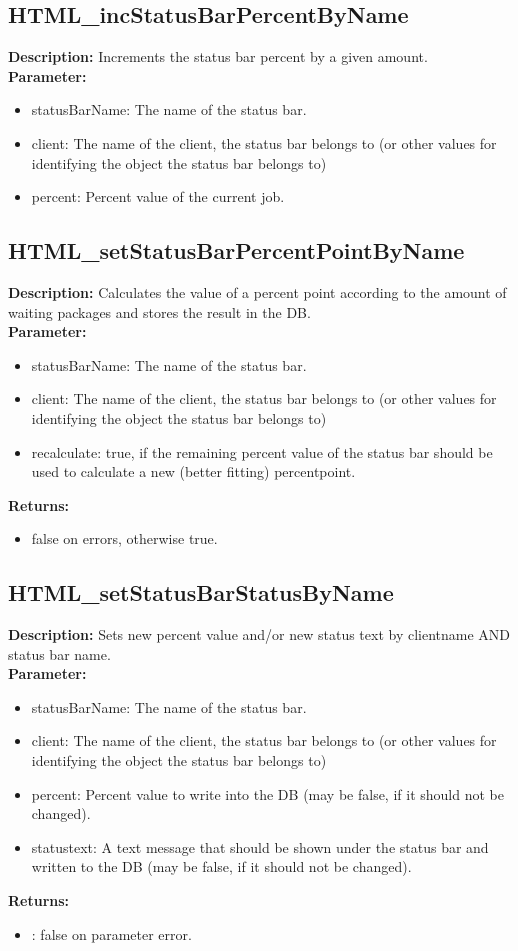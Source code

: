 \subsection{HTML\_incStatusBarPercentByName}
\textbf{Description:} Increments the status bar percent by a given amount.\\
\textbf{Parameter:}
\begin{itemize}
\item statusBarName: The name of the status bar.
\item client: The name of the client, the status bar belongs to (or other values for identifying the object the status bar belongs to)
\item percent: Percent value of the current job.
\end{itemize}

\subsection{HTML\_setStatusBarPercentPointByName}
\textbf{Description:} Calculates the value of a percent point according to the amount of waiting packages and stores the result in the DB.\\
\textbf{Parameter:}
\begin{itemize}
\item statusBarName: The name of the status bar.
\item client: The name of the client, the status bar belongs to (or other values for identifying the object the status bar belongs to)
\item recalculate: true, if the remaining percent value of the status bar should be used to calculate a new (better fitting) percentpoint.
\end{itemize}
\textbf{Returns:}
\begin{itemize}
\item false on errors, otherwise true.
\end{itemize}

\subsection{HTML\_setStatusBarStatusByName}
\textbf{Description:} Sets new percent value and/or new status text by clientname AND status bar name.\\
\textbf{Parameter:}
\begin{itemize}
\item statusBarName: The name of the status bar.
\item client: The name of the client, the status bar belongs to (or other values for identifying the object the status bar belongs to)
\item percent: Percent value to write into the DB (may be false, if it should not be changed).
\item statustext: A text message that should be shown under the status bar and written to the DB (may be false, if it should not be changed).
\end{itemize}
\textbf{Returns:}
\begin{itemize}
\item : false on parameter error.
\end{itemize}

